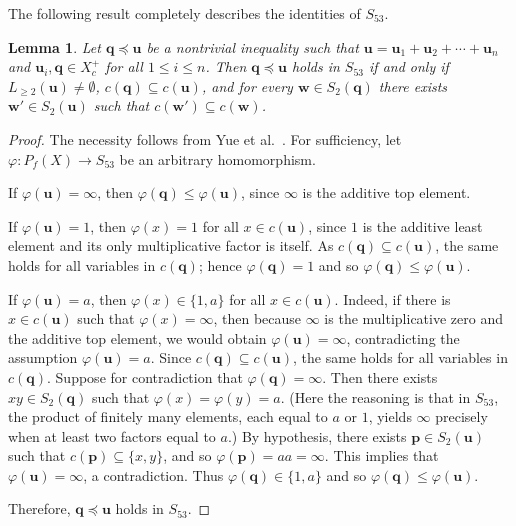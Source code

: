 \documentclass[reqno]{amsart}
\theoremstyle{plain}
\newtheorem{lem}[thm]{Lemma}
\theoremstyle{definition}
\newcommand{\bp}{\mathbf{p}}
\newcommand{\bq}{\mathbf{q}}
\newcommand{\bu}{\mathbf{u}}
\newcommand{\bw}{\mathbf{w}}
\begin{document}
The following result completely describes the identities of $S_{53}$.
\begin{lem}\label{lem5303}
Let $\bq\preceq\bu$ be a nontrivial inequality such that
$\bu=\bu_1+\bu_2+\cdots+\bu_n$ and $\bu_i, \bq \in X^+_c$ for all $1\leq i \leq n$.
Then $\bq\preceq\bu$ holds in $S_{53}$
if and only if $L_{\geq 2}(\bu)\neq \emptyset$, $c(\bq)\subseteq c(\bu)$,
and for every $\bw\in S_2(\bq)$ there exists $\bw'\in S_2(\bu)$ such that $c(\bw')\subseteq c(\bw)$.
\end{lem}
\begin{proof}
The necessity follows from Yue et al.~\cite[Lemma 3.7]{yrzs}.
For sufficiency,
let $\varphi\colon P_f(X) \to S_{53}$ be an arbitrary homomorphism.

If $\varphi(\bu)=\infty$, then $\varphi(\bq)\leq \varphi(\bu)$,
since $\infty$ is the additive top element.

If $\varphi(\bu)=1$, then $\varphi(x)=1$ for all $x\in c(\bu)$,
since $1$ is the additive least element and its only multiplicative factor is itself.
As $c(\bq)\subseteq c(\bu)$, the same holds for all variables in $c(\bq)$;
hence $\varphi(\bq)=1$ and so $\varphi(\bq)\leq \varphi(\bu)$.

If $\varphi(\bu)=a$, then $\varphi(x)\in \{1, a\}$ for all $x\in c(\bu)$.
Indeed, if there is $x\in c(\bu)$ such that $\varphi(x)=\infty$,
then because $\infty$ is the multiplicative zero and the additive top element,
we would obtain $\varphi(\bu)=\infty$, contradicting the assumption $\varphi(\bu)=a$.
Since $c(\bq)\subseteq c(\bu)$, the same holds for all variables in $c(\bq)$.
Suppose for contradiction that $\varphi(\bq)=\infty$.
Then there exists $xy\in S_2(\bq)$ such that $\varphi(x)=\varphi(y)=a$.
(Here the reasoning is that in $S_{53}$, the product of finitely many elements,
each equal to $a$ or $1$, yields $\infty$ precisely when at least two factors equal to $a$.)
By hypothesis, there exists $\bp\in S_2(\bu)$ such that $c(\bp)\subseteq \{x, y\}$,
and so $\varphi(\bp)=aa=\infty$.
This implies that $\varphi(\bu)=\infty$, a contradiction.
Thus $\varphi(\bq)\in \{1, a\}$ and so $\varphi(\bq)\leq \varphi(\bu)$.

Therefore, $\bq\preceq\bu$ holds in $S_{53}$.
\end{proof}
\end{document}
